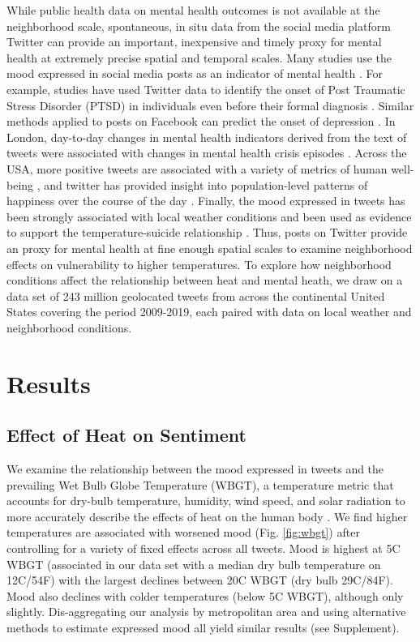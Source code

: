 \documentclass[9pt,twocolumn,twoside,lineno]{pnas-new}
\begin{document}
While public health data on mental health outcomes is not available at the neighborhood scale, spontaneous, in situ data from the social media platform Twitter can provide an important, inexpensive and timely proxy for mental health at extremely precise spatial and temporal scales. Many studies use the mood expressed in social media posts as an indicator of mental health \cite{Edo-Osagie2020Jul, Sinnenberg2016Dec}. For example, studies have used Twitter data to identify the onset of Post Traumatic Stress Disorder (PTSD) in individuals even before their formal diagnosis \cite{Reece2017Oct}. Similar methods applied to posts on Facebook can predict the onset of depression \cite{Eichstaedt2018Oct}. In London, day-to-day changes in mental health indicators derived from the text of tweets were associated with changes in mental health crisis episodes \cite{Kolliakou2020Feb}. Across the USA, more positive tweets are associated with a variety of metrics of human well-being \cite{Mitchell2013May}, and twitter has provided insight into population-level patterns of happiness over the course of the day \cite{Dodds2011}. Finally, the mood expressed in tweets has been strongly associated with local weather conditions \cite{baylis_weather_2018} and been used as evidence to support the temperature-suicide relationship \cite{Burke2018Aug}. Thus, posts on Twitter provide an proxy for mental health at fine enough spatial scales to examine neighborhood effects on vulnerability to higher temperatures. To explore how neighborhood conditions affect the relationship between heat and mental heath, we draw on a data set of 243 million geolocated tweets from across the continental United States covering the period 2009-2019, each paired with data on local weather and neighborhood conditions.

\section*{Results}
\subsection*{Effect of Heat on Sentiment}
We examine the relationship between the mood expressed in tweets and the prevailing Wet Bulb Globe Temperature (WBGT), a temperature metric that accounts for dry-bulb temperature, humidity, wind speed, and solar radiation to more accurately describe the effects of heat on the human body \cite{budd2008wet}. We find higher temperatures are associated with worsened mood (Fig. \ref{fig:wbgt}) after controlling for a variety of fixed effects across all tweets. Mood is highest at 5\textdegree C WBGT (associated in our data set with a median dry bulb temperature on 12\textdegree C/54\textdegree F) with the largest declines between 20\textdegree C WBGT (dry bulb 29\textdegree C/84\textdegree F). Mood also declines with colder temperatures (below 5\textdegree C WBGT), although only slightly. Dis-aggregating our analysis by metropolitan area and using alternative methods to estimate expressed mood all yield similar results (see Supplement).
\end{document}
